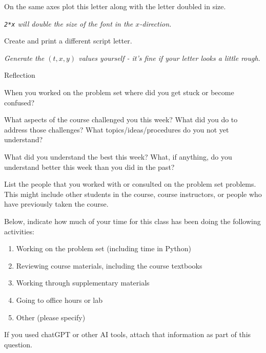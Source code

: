 \documentclass[12pt,letterpaper,noanswers]{exam}
\begin{document}
\begin{questions}
\begin{parts}
\item On the same axes plot this letter along with the letter doubled in size.

\emph{\texttt{2*x} will double the size of the font in the $x$-direction.}

\item Create and print a different script letter.

\emph{Generate the $(t,x,y)$ values yourself - it's fine if your letter looks a little rough.}
\end{parts}









\question Reflection
\begin{parts}
\item When you worked on the problem set where did you get stuck or become confused?
\item What aspects of the course challenged you this week?  What did you do to address those challenges?  What topics/ideas/procedures do you not yet understand?
\item What did you understand the best this week?  What, if anything, do you understand better this week than you did in the past?
\item List the people that you worked with or consulted on the problem set problems.  This might include other students in the course, course instructors, or people who have previously taken the course.
\item Below, indicate how much of your time for this class has been doing the following activities:
	\begin{enumerate}
	\item Working on the problem set (including time in Python)
	\item Reviewing course materials, including the course textbooks
	\item Working through supplementary materials
	\item Going to office hours or lab
	\item Other (please specify)
	\end{enumerate}
\item If you used chatGPT or other AI tools, attach that information as part of this question.
\end{parts}

\end{questions}
\end{document}
